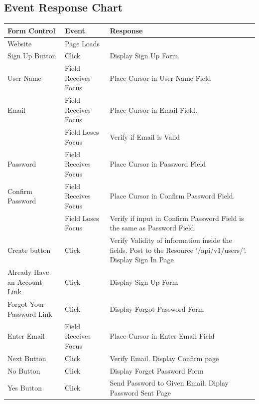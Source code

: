 \documentclass{report}
\begin{document}
\newpage

\begin{center}
\newpage
	\section*{Event Response Chart}	
	\begin{tabular}{ m{1.5in} | m{1.5in} | m{1.5in} }	
	\textbf{Form Control} & \textbf{Event} & \textbf{Response} \\
	\hline
	Website 				& Page Loads 			& \\
	\hline
	Sign Up Button 		& Click 					& Display Sign Up Form \\
	\hline
	User Name 			& Field Receives Focus 	& Place Cursor in User Name Field \\
	\hline
	Email 				& Field Receives Focus 	& Place Cursor in Email Field. \\ \cline{2-3}
	      				& Field Loses Focus 		& Verify if Email is Valid \\
	\hline
	Password 			& Field Receives Focus 	& Place Cursor in Password Field \\
	\hline
	Confirm Password 	& Field Receives Focus 	& Place Cursor in Confirm Password Field. \\ \cline{2-3}
						& Field Loses Focus 		& Verify if input in Confirm Password Field is the same as Password Field \\
	\hline
	Create button 		& Click 					& Verify Validity of information inside the fields. Post to the Resource '/api/v1/users/'. Display Sign In Page  	\\
	\hline
	Already Have an Account Link & Click 			& Display Sign Up Form \\
	\hline
	Forgot Your Password Link & Click 			& Display Forgot Password Form \\
	\hline 	
	Enter Email 			& Field Receives Focus 	& Place Cursor in Enter Email Field \\
	\hline
	Next Button 			& Click 					& Verify Email. Display Confirm page \\
	\hline
	No Button 			& Click				 	& Display Forget Password Form \\
	\hline
	Yes Button 			& Click 					& Send Password to Given Email. Diplay Password Sent Page \\
	\end{tabular}
	\newpage
	

\end{center}
\end{document}
